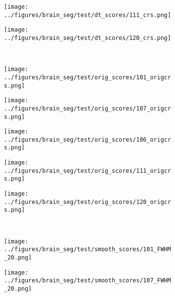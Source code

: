 \begin{figure}[h!]
	\begin{subfigure}{0.16\textwidth}
		\centering
		\texttt{[image: ../figures/brain\_seg/test/dt\_scores/111\_crs.png]}
		\label{fig:9}
	\end{subfigure}
			\begin{subfigure}{0.16\textwidth}
					\centering
					\texttt{[image: ../figures/brain\_seg/test/dt\_scores/120\_crs.png]}
					\label{fig:10}
				\end{subfigure}
		\\
	\vspace{-0.35cm}
	\begin{subfigure}{0.16\textwidth}
		\centering
		\texttt{[image: ../figures/brain\_seg/test/orig\_scores/101\_origcrs.png]}
		\label{fig:6}
	\end{subfigure}
	\begin{subfigure}{0.16\textwidth}
		\centering
		\texttt{[image: ../figures/brain\_seg/test/orig\_scores/107\_origcrs.png]}
		\label{fig:7}
	\end{subfigure}
	\begin{subfigure}{0.16\textwidth}
		\centering
		\texttt{[image: ../figures/brain\_seg/test/orig\_scores/106\_origcrs.png]}
		\label{fig:8}
	\end{subfigure}
	\begin{subfigure}{0.16\textwidth}
		\centering
		\texttt{[image: ../figures/brain\_seg/test/orig\_scores/111\_origcrs.png]}
		\label{fig:9}
	\end{subfigure}
	\begin{subfigure}{0.16\textwidth}
		\centering
		\texttt{[image: ../figures/brain\_seg/test/orig\_scores/120\_origcrs.png]}
		\label{fig:10}
	\end{subfigure}
			\\
	\vspace{-0.35cm}
	\begin{subfigure}{0.16\textwidth}
		\centering
		\texttt{[image: ../figures/brain\_seg/test/smooth\_scores/101\_FWHM\_20.png]}
		\label{fig:6}
	\end{subfigure}
	\begin{subfigure}{0.16\textwidth}
		\centering
		\texttt{[image: ../figures/brain\_seg/test/smooth\_scores/107\_FWHM\_20.png]}
		\label{fig:7}
	\end{subfigure}
	\begin{subfigure}{0.16\textwidth}

\end{subfigure}
\end{figure}
